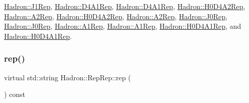\mbox{\hyperlink{structHadron_1_1J1Rep_a59c9039238a259026aa68b2c30b3822a}{Hadron\+::\+J1\+Rep}}, \mbox{\hyperlink{structHadron_1_1D4A1Rep_ae553df618a4dc5019fa2b0d1c43443b0}{Hadron\+::\+D4\+A1\+Rep}}, \mbox{\hyperlink{structHadron_1_1D4A1Rep_ae553df618a4dc5019fa2b0d1c43443b0}{Hadron\+::\+D4\+A1\+Rep}}, \mbox{\hyperlink{structHadron_1_1H0D4A2Rep_ab746308c018d06bc8d3e1822f84c9049}{Hadron\+::\+H0\+D4\+A2\+Rep}}, \mbox{\hyperlink{structHadron_1_1A2Rep_a17b15564f35f6be6afa4a189806da16b}{Hadron\+::\+A2\+Rep}}, \mbox{\hyperlink{structHadron_1_1H0D4A2Rep_ab746308c018d06bc8d3e1822f84c9049}{Hadron\+::\+H0\+D4\+A2\+Rep}}, \mbox{\hyperlink{structHadron_1_1A2Rep_a17b15564f35f6be6afa4a189806da16b}{Hadron\+::\+A2\+Rep}}, \mbox{\hyperlink{structHadron_1_1J0Rep_a99c9a3c8bac7e89e8f393fdd0cdd8c64}{Hadron\+::\+J0\+Rep}}, \mbox{\hyperlink{structHadron_1_1J0Rep_a99c9a3c8bac7e89e8f393fdd0cdd8c64}{Hadron\+::\+J0\+Rep}}, \mbox{\hyperlink{structHadron_1_1A1Rep_a4f7f61f8c9a5113c9407be6609cf7fbe}{Hadron\+::\+A1\+Rep}}, \mbox{\hyperlink{structHadron_1_1A1Rep_a4f7f61f8c9a5113c9407be6609cf7fbe}{Hadron\+::\+A1\+Rep}}, \mbox{\hyperlink{structHadron_1_1H0D4A1Rep_ac5a45aa7f7cdc3ab70b8c164b2e1dce0}{Hadron\+::\+H0\+D4\+A1\+Rep}}, and \mbox{\hyperlink{structHadron_1_1H0D4A1Rep_ac5a45aa7f7cdc3ab70b8c164b2e1dce0}{Hadron\+::\+H0\+D4\+A1\+Rep}}.

\mbox{\label{structHadron_1_1RepRep_ab3213025f6de249f7095892109575fde}} 
\subsubsection{\texorpdfstring{rep()}{rep()}}
{\footnotesize\ttfamily virtual std\+::string Hadron\+::\+Rep\+Rep\+::rep (\begin{DoxyParamCaption}{ }\end{DoxyParamCaption}) const\hspace{0.3cm}{\ttfamily [pure virtual]}}



